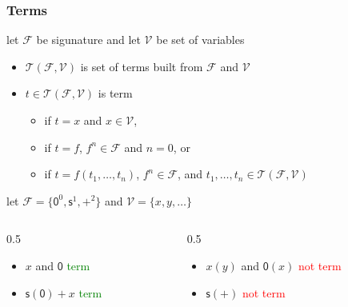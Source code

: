 \documentclass[12pt,aspectratio=169]{beamer}
\newcommand{\m}[1]{\mathsf{#1}}
\newcommand{\FF}{\mathcal{F}}
\newcommand{\VV}{\mathcal{V}}
\newcommand{\TT}{\mathcal{T}}
\newlength{\mytotalwidth}
\newlength{\mycolumnwidth}
\begin{document}
\begin{frame}
    \frametitle{Terms}
    \begin{definition}
        let $\FF$ be sigunature and let $\VV$ be set of variables
        \begin{itemize}
            \item \alert{$\TT(\FF,\VV)$} is set of terms built from $\FF$ and $\VV$
            \item $t \in \TT(\FF,\VV)$ is \alert{term}
                \begin{itemize}
                    \item if $t = x$ and $x \in \VV$,
                    \item if $t = f$, $f^n \in \FF$ and $n = 0$, or
                    \item if $t = f(t_1, \dots, t_n)$, $f^n \in \FF$, and $t_1, \dots, t_n \in \TT(\FF,\VV)$ 
                \end{itemize}
        \end{itemize}
    \end{definition}
    \begin{example}
        let $\FF = \{\m{0}^0, \m{s}^1, \m{+}^2\}$ and $\VV = \{x,y,\dots\}$
        \vspace{-12pt}
        \begin{columns}[totalwidth=\mytotalwidth]
            \begin{column}[t]{0.5\mycolumnwidth}
                \begin{itemize}
                    \item $x$ and $\m{0}$ \quad \textcolor{green}{term}
                    \item $\m{s}(\m{0}) + x$ \quad \textcolor{green}{term}
                \end{itemize}
            \end{column}
            \begin{column}[t]{0.5\mycolumnwidth}
                \begin{itemize}
                    \item $x(y)$ and $\m{0}(x)$ \quad \textcolor{red}{not term}
                    \item $\m{s}(+)$ \quad \textcolor{red}{not term}
                \end{itemize}
            \end{column}
        \end{columns}
    \end{example}
\end{frame}
\end{document}
